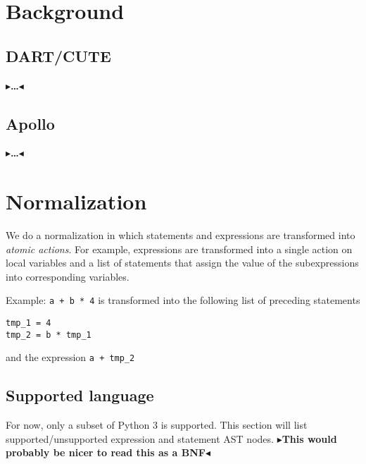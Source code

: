 \documentclass[11pt]{report}
\newcommand{\todo}[1]{{\color[rgb]{.5,0,0}\textbf{$\blacktriangleright$#1$\blacktriangleleft$}}}
\begin{document}

\chapter{Background}
\label{ch:background}

\section{DART/CUTE}
\todo{\dots}

\section{Apollo}
\todo{\dots}


\chapter{Normalization}
\label{ch:norm}

We do a normalization in which statements and expressions are transformed into
\emph{atomic actions}. For example, expressions are transformed into a single
action on local variables and a list of statements that assign the value of the
subexpressions into corresponding variables.

Example: \verb!a + b * 4! is transformed into the following list of
preceding statements
\begin{verbatim}
tmp_1 = 4
tmp_2 = b * tmp_1
\end{verbatim}
and the expression \verb!a + tmp_2!

\section{Supported language}
For now, only a subset of Python 3 is supported. This section will
list supported/unsupported expression and statement AST nodes.
\todo{This would probably be nicer to read this as a BNF}
\end{document}
